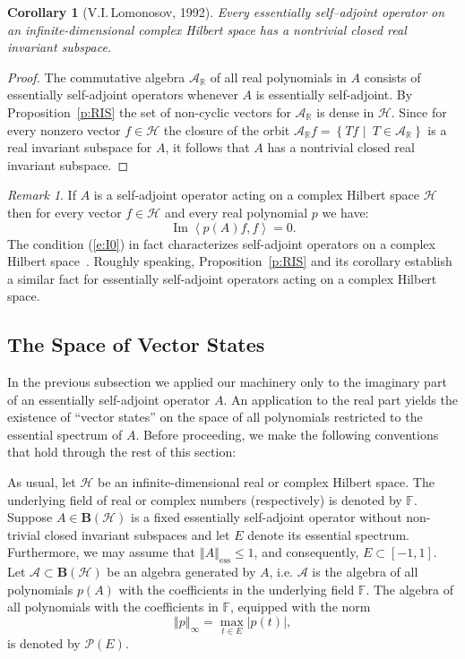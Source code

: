 \documentclass{tran-l}
\newtheorem{cor}[thm]{Corollary}
\theoremstyle{definition}
\theoremstyle{remark}
\newtheorem{rem}[thm]{Remark}
\numberwithin{equation}{subsection}
\DeclareMathOperator{\IM}{Im}
\DeclareMathOperator{\ess}{ess}
\newcommand{\h}{\mathcal{H}}
\newcommand{\A}{\mathcal{A}}
\newcommand{\BH}{\mathbf{B}(\mathcal{H})}
\newcommand{\Real}{\mathbb{R}}
\newcommand{\Field}{\mathbb{F}}
\newcommand{\Poly}{\mathcal{P}(E)}
\newcommand{\abs}[1]{\left\vert#1\right\vert}
\newcommand{\set}[1]{\left\{#1\right\}}
\newcommand{\seq}[1]{\left<#1\right>}
\newcommand{\norm}[1]{\left\Vert#1\right\Vert}
\newcommand{\essnorm}[1]{\norm{#1}_{\ess}}
\begin{document}
\begin{cor}[V.I.\,Lomonosov, 1992]
Every essentially self--adjoint operator on an infinite-dimensional complex Hilbert space has a nontrivial closed real invariant subspace.
\end{cor}

\begin{proof}
The commutative algebra $\A_{\Real}$ of all real polynomials in $A$ consists of essentially self-adjoint operators whenever $A$ is essentially self-adjoint. By Proposition~\ref{p:RIS} the set of non-cyclic vectors for $\A_{\Real}$ is dense in $\h$. Since for every nonzero vector $f\in\h$ the closure of the orbit $\A_{\Real}f=\set{T{f}\,\,|\,\,\,T\in\A_{\Real}}$ is a real invariant subspace for $A$, it follows that $A$ has a nontrivial closed real invariant subspace.
\end{proof}

\begin{rem}
If $A$ is a self-adjoint operator acting on a complex Hilbert space $\h$ then for every vector $f\in\h$ and every real polynomial $p$ we have:
\begin{equation} \label{e:I0}
  \IM\seq{p(A){f},f}=0.
\end{equation}
The condition (\ref{e:I0}) in fact characterizes self-adjoint operators on a complex Hilbert space~\cite[p.~103]{KR83}. Roughly speaking, Proposition~\ref{p:RIS} and its corollary establish a similar fact for essentially self-adjoint operators acting on a complex Hilbert space.
\end{rem}


\subsection{The Space of Vector States}
In the previous subsection we applied our machinery only to the imaginary part of an essentially self-adjoint operator $A$. An application to the real part yields the existence of ``vector states'' on the space of all polynomials restricted to the essential spectrum of $A$. Before proceeding, we make the following conventions that hold through the rest of this section:

As usual, let $\h$ be an infinite-dimensional real or complex Hilbert space. The underlying field of real or complex numbers (respectively) is denoted by $\Field$. Suppose $A\in\BH$ is a fixed essentially self-adjoint operator without non-trivial closed invariant subspaces and let $E$ denote its essential spectrum. Furthermore, we may assume that $\essnorm{A}\leq1$, and consequently, $E\subset[-1,1]$. Let $\A\subset\BH$ be an algebra generated by $A$, i.e. $\A$ is the algebra of all polynomials $p(A)$ with the coefficients in the underlying field $\Field$. The algebra of all polynomials with the coefficients in $\Field$, equipped with the norm
\[ \norm{p}_\infty=\max_{t\in{E}} \abs{p(t)}, \]
is denoted by $\Poly$.
\end{document}
